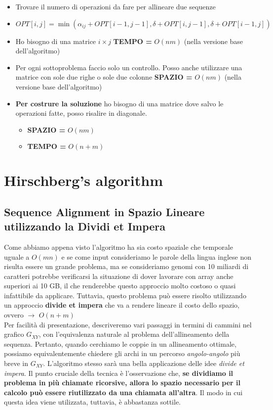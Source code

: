\begin{itemize}
	\item
	      Trovare il numero di operazioni da fare per allineare due sequenze
	\item
	      $OPT[i,j] = \min (\alpha_{ij} + OPT[i-1,j-1], \delta + OPT[i, j-1], \delta + OPT[i-1, j])$
	\item
	      Ho bisogno di una matrice $i \times j$ \textbf{TEMPO =} $O(nm)$
	      (nella versione base dell'algoritmo)
	\item
	      Per ogni sottoproblema faccio solo un controllo. Posso anche
	      utilizzare una matrice con sole due righe o sole due colonne
	      \textbf{SPAZIO =} $O(nm)$ (nella versione base dell'algoritmo)
	\item
	      \textbf{Per costrure la soluzione} ho bisogno di una matrice dove
	      salvo le operazioni fatte, posso risalire in diagonale.

	      \begin{itemize}
		      \item
		            \textbf{SPAZIO =} $O(nm)$
		      \item
		            \textbf{TEMPO =} $O(n+m)$
	      \end{itemize}
\end{itemize}

\section{Hirschberg's algorithm}

\subsection{Sequence Alignment in Spazio Lineare utilizzando la Dividi et Impera}

Come abbiamo appena visto l'algoritmo ha sia costo spaziale che
temporale uguale a $O(mn)$ e se come input consideriamo le parole
della lingua inglese non risulta essere un grande problema, ma se
consideriamo genomi con 10 miliardi di caratteri potrebbe verificarsi la
situazione di dover lavorare con array anche superiori ai 10 GB, il che
renderebbe questo approccio molto costoso o quasi infattibile da
applicare. Tuttavia, questo problema può essere risolto utilizzando un
approccio \textbf{divide et impera} che va a rendere lineare il costo
dello spazio, ovvero $\rightarrow$ $O(n + m)$\\

Per facilità di presentazione, descriveremo vari passaggi in termini di
cammini nel grafico $G_{XY}$, con l'equivalenza naturale al problema
dell'allineamento della sequenza. Pertanto, quando cerchiamo le coppie
in un allineamento ottimale, possiamo equivalentemente chiedere gli
archi in un percorso \emph{angolo-angolo} più breve in $G_{XY}$.
L'algoritmo stesso sarà una bella applicazione delle idee \emph{divide
	et impera}. Il punto cruciale della tecnica è l'osservazione che,
\textbf{se dividiamo il problema in più chiamate ricorsive, allora lo
	spazio necessario per il calcolo può essere riutilizzato da una chiamata
	all'altra}. Il modo in cui questa idea viene utilizzata, tuttavia, è
abbastanza sottile.

